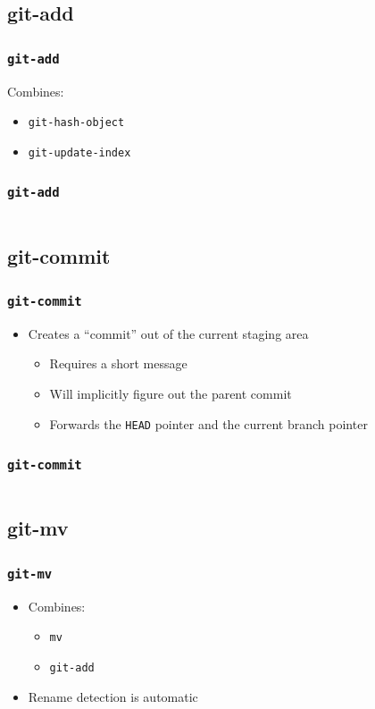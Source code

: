 \documentclass[]{beamer}
\begin{document}
\subsection{git-add}
\begin{frame}
\frametitle{\texttt{git-add}}
Combines:
\begin{itemize}
\item{\texttt{git-hash-object}}
\item{\texttt{git-update-index}}
\end{itemize}
\end{frame}

\begin{frame}[fragile]
\frametitle{\texttt{git-add}}
\inputminted{bash}{code/4/1}
\end{frame}

\subsection{git-commit}
\begin{frame}
\frametitle{\texttt{git-commit}}
\begin{itemize}
\item{Creates a ``commit'' out of the current staging area}
\begin{itemize}
\item{Requires a short message}
\item{Will implicitly figure out the parent commit}
\item{Forwards the \texttt{HEAD} pointer and the current branch pointer}
\end{itemize}
\end{itemize}
\end{frame}

\begin{frame}[fragile]
\frametitle{\texttt{git-commit}}
\inputminted{bash}{code/4/2}
\end{frame}

\subsection{git-mv}
\begin{frame}
\frametitle{\texttt{git-mv}}
\begin{itemize}
\item{Combines:}
\begin{itemize}
\item{\texttt{mv}}
\item{\texttt{git-add}}
\end{itemize}
\item{Rename detection is automatic}
\end{itemize}
\end{frame}
\end{document}
